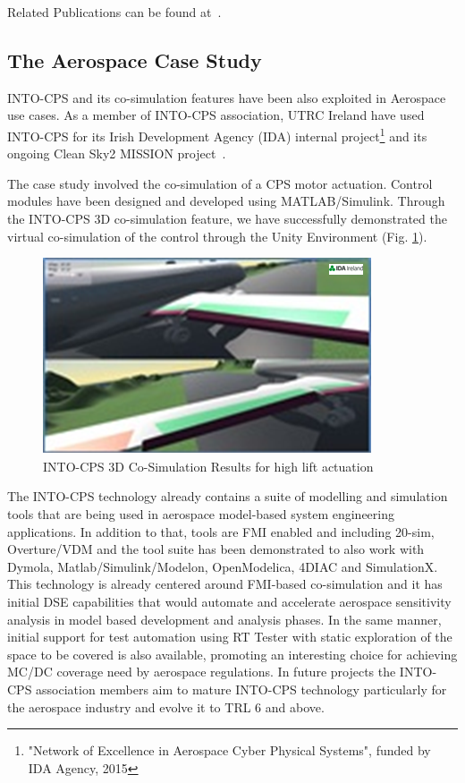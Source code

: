 Related Publications can be found at~\cite{Larsen&16d,Hasanagic&18b}.

\subsection{The Aerospace Case Study}
INTO-CPS and its co-simulation features have been also exploited in Aerospace use cases. As a member of INTO-CPS association, UTRC Ireland have used INTO-CPS for its Irish Development Agency (IDA) internal project\footnote{"Network of Excellence in Aerospace Cyber Physical Systems", funded by IDA Agency, 2015} and its ongoing Clean Sky2 MISSION project~\cite{Burgio&17}.

The case study involved the co-simulation of a CPS motor actuation. Control modules have been designed and developed using MATLAB/Simulink. Through the INTO-CPS 3D co-simulation feature, we have successfully demonstrated the virtual co-simulation of the control through the Unity Environment (Fig. \ref{fig:aero}).

\begin{figure}[!ht]
	\centering
		\includegraphics[width=0.9 \textwidth]{./figures/aero}
	\caption{INTO-CPS 3D Co-Simulation Results for high lift actuation}
	\label{fig:aero}
\end{figure}

The INTO-CPS technology already contains a suite of modelling and simulation tools that are being used in aerospace model-based system engineering applications. In addition to that, tools are FMI enabled and including 20-sim, Overture/VDM and the tool suite has been demonstrated to also work with Dymola, Matlab/Simulink/Modelon, OpenModelica, 4DIAC and SimulationX. This technology is already centered around FMI-based co-simulation and it has initial DSE capabilities that would automate and accelerate aerospace sensitivity analysis in model based development and analysis phases. In the same manner, initial support for test automation using RT Tester with static exploration of the space to be covered is also available, promoting an interesting choice for achieving MC/DC coverage need by aerospace regulations. In future projects the INTO-CPS association members aim to mature INTO-CPS  technology particularly for the aerospace industry and evolve it to TRL 6 and above.

